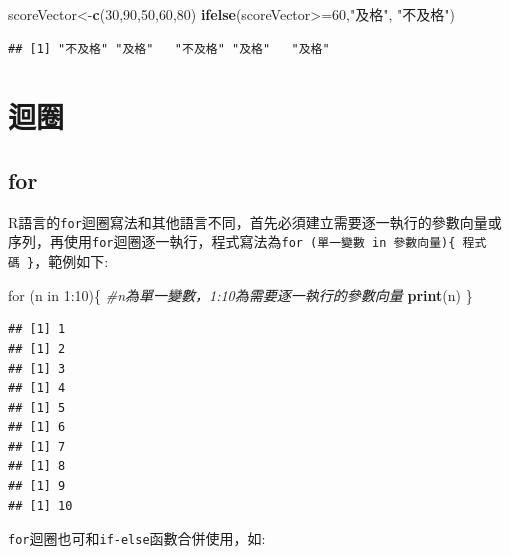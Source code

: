 \documentclass[]{book}
\newenvironment{Shaded}{\begin{snugshade}}{\end{snugshade}}
\newcommand{\KeywordTok}[1]{\textcolor[rgb]{0.13,0.29,0.53}{\textbf{{#1}}}}
\newcommand{\DecValTok}[1]{\textcolor[rgb]{0.00,0.00,0.81}{{#1}}}
\newcommand{\StringTok}[1]{\textcolor[rgb]{0.31,0.60,0.02}{{#1}}}
\newcommand{\CommentTok}[1]{\textcolor[rgb]{0.56,0.35,0.01}{\textit{{#1}}}}
\newcommand{\NormalTok}[1]{{#1}}
\theoremstyle{definition}
\theoremstyle{definition}
\theoremstyle{remark}
\begin{document}
\begin{Shaded}
\begin{Highlighting}[]
\NormalTok{scoreVector<-}\KeywordTok{c}\NormalTok{(}\DecValTok{30}\NormalTok{,}\DecValTok{90}\NormalTok{,}\DecValTok{50}\NormalTok{,}\DecValTok{60}\NormalTok{,}\DecValTok{80}\NormalTok{)}
\KeywordTok{ifelse}\NormalTok{(scoreVector>=}\DecValTok{60}\NormalTok{,}\StringTok{"及格"}\NormalTok{, }\StringTok{"不及格"}\NormalTok{)}
\end{Highlighting}
\end{Shaded}

\begin{verbatim}
## [1] "不及格" "及格"   "不及格" "及格"   "及格"
\end{verbatim}

\section{迴圈}

\subsection{for}\label{for}

R語言的\texttt{for}迴圈寫法和其他語言不同，首先必須建立需要逐一執行的參數向量或序列，再使用\texttt{for}迴圈逐一執行，程式寫法為\texttt{for\ (單一變數\ in\ 參數向量)\{\ 程式碼\ \}}，範例如下:

\begin{Shaded}
\begin{Highlighting}[]
\NormalTok{for (n in }\DecValTok{1}\NormalTok{:}\DecValTok{10}\NormalTok{)\{ }\CommentTok{#n為單一變數，1:10為需要逐一執行的參數向量}
  \KeywordTok{print}\NormalTok{(n)}
\NormalTok{\}}
\end{Highlighting}
\end{Shaded}

\begin{verbatim}
## [1] 1
## [1] 2
## [1] 3
## [1] 4
## [1] 5
## [1] 6
## [1] 7
## [1] 8
## [1] 9
## [1] 10
\end{verbatim}

\texttt{for}迴圈也可和\texttt{if-else}函數合併使用，如:

\begin{Shaded}
\end{Shaded}
\end{document}
